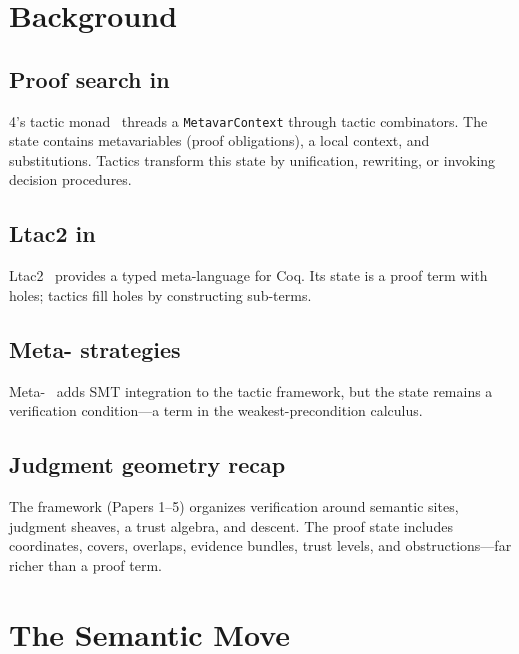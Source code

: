 \documentclass[11pt]{article}
\begin{document}
\section{Background}\label{sec:background}

\subsection{Proof search in \LEAN}

\LEAN{} 4's tactic monad~\cite{deMoura2021Lean4} threads a
\texttt{MetavarContext} through tactic combinators.  The state
contains metavariables (proof obligations), a local context,
and substitutions.  Tactics transform this state by unification,
rewriting, or invoking decision procedures.

\subsection{Ltac2 in \Coq}

Ltac2~\cite{Pedrot2019Ltac2} provides a typed meta-language
for Coq.  Its state is a proof term with holes; tactics fill
holes by constructing sub-terms.

\subsection{Meta-\Fstar{} strategies}

Meta-\Fstar{}~\cite{MartinezEtAl2019MetaFStar} adds SMT
integration to the tactic framework, but the state remains
a verification condition---a term in the weakest-precondition
calculus.

\subsection{Judgment geometry recap}

The \JuGeo{} framework (Papers 1--5) organizes verification
around semantic sites, judgment sheaves, a trust algebra, and
descent.  The proof state includes coordinates, covers,
overlaps, evidence bundles, trust levels, and obstructions---far
richer than a proof term.


\section{The Semantic Move}\label{sec:move}
\end{document}
